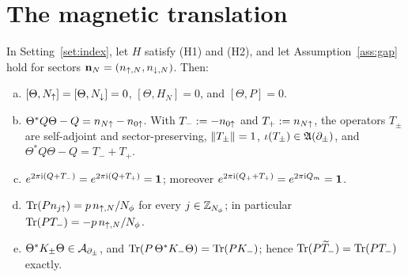 \section{The magnetic translation}\label{sec:translation}

\begin{lemma}\label{lem:theta}
In Setting~\ref{set:index}, let $H$ satisfy (H1) and (H2), and let Assumption~\ref{ass:gap} hold for sectors
$\mathbf{n}_N=(n_{{\uparrow},N},n_{{\downarrow},N})$. Then:
\begin{enumerate}[(a)]
\item $[\Theta,N_{\uparrow}]=[\Theta,N_{\downarrow}]=0$, $[\Theta,H_N]=0$, and $[\Theta,P]=0$.
\item $\Theta^*Q\Theta-Q=n_{N{\uparrow}}-n_{0{\uparrow}}$. With $T_-:=-n_{0{\uparrow}}$ and $T_+:=n_{N{\uparrow}}$, the operators $T_\pm$ are
self-adjoint and sector-preserving, $\lVert T_\pm\rVert=1$, $\iota(T_\pm)\in\mathfrak{A}(\partial_\pm)$, and
$\Theta^*Q\Theta-Q=T_-+T_+$.
\item $e^{2\pi\mathrm{i}(Q+T_-)}=e^{2\pi\mathrm{i}(Q+T_+)}=\mathbf{1}$; moreover $e^{2\pi\mathrm{i}(Q_++T_+)}=e^{2\pi\mathrm{i} Q_m}=\mathbf{1}$.
\item $\operatorname{Tr}(Pn_{j{\uparrow}})=p\,n_{{\uparrow},N}/N_{\phi}$ for every $j\in\mathbb{Z}_{N_{\phi}}$; in particular $\operatorname{Tr}(PT_-)=-p\,n_{{\uparrow},N}/N_{\phi}$.
\item $\Theta^*K_\pm\Theta\in\mathcal{A}_{\partial_\pm}$, and $\operatorname{Tr}(P\,\Theta^*K_-\Theta)=\operatorname{Tr}(PK_-)$; hence $\operatorname{Tr}(P\widetilde{T}_{-})=\operatorname{Tr}(PT_-)$ exactly.
\end{enumerate}
\end{lemma}

